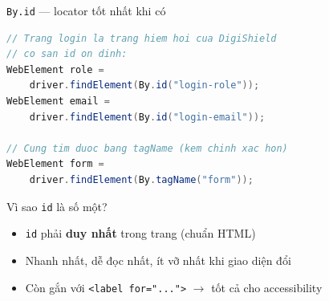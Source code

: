 \documentclass[aspectratio=169,12pt]{beamer}
\begin{document}
\begin{frame}[fragile]{\texttt{By.id} --- locator tốt nhất khi có}
\begin{lstlisting}[language=java]
// Trang login la trang hiem hoi cua DigiShield
// co san id on dinh:
WebElement role =
    driver.findElement(By.id("login-role"));
WebElement email =
    driver.findElement(By.id("login-email"));

// Cung tim duoc bang tagName (kem chinh xac hon)
WebElement form =
    driver.findElement(By.tagName("form"));
\end{lstlisting}

  \begin{block}{Vì sao \texttt{id} là số một?}
    \begin{itemize}
      \item \texttt{id} phải \textbf{duy nhất} trong trang (chuẩn HTML)
      \item Nhanh nhất, dễ đọc nhất, ít vỡ nhất khi giao diện đổi
      \item Còn gắn với \texttt{<label for="...">} $\to$ tốt cả cho accessibility
    \end{itemize}
  \end{block}
\end{frame}
\end{document}
